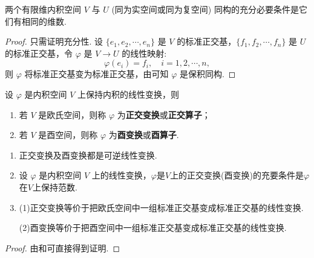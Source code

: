 \documentclass[../../main.tex]{subfiles}%
\begin{document}
\begin{corollary}\label{corollary:有限维内积空间同构的充要条件}
两个有限维内积空间 $V$ 与 $U$ (同为实空间或同为复空间) 同构的充分必要条件是它们有相同的维数.
\end{corollary}
\begin{proof}
只需证明充分性. 设 $\{e_1,e_2,\cdots,e_n\}$ 是 $V$ 的标准正交基，$\{f_1,f_2,\cdots,f_n\}$ 是 $U$ 的标准正交基，令 $\varphi$ 是 $V \to U$ 的线性映射:
\[
\varphi(e_i) = f_i,\quad i = 1,2,\cdots,n,
\]
则 $\varphi$ 将标准正交基变为标准正交基，由可知 $\varphi$ 是保积同构.
\end{proof}

\begin{definition}
设 $\varphi$ 是内积空间 $V$ 上保持内积的线性变换，则
\begin{enumerate}
\item 若 $V$ 是欧氏空间，则称 $\varphi$ 为\textbf{正交变换}或\textbf{正交算子}；

\item 若 $V$ 是酉空间，则称 $\varphi$ 为\textbf{酉变换}或\textbf{酉算子}.
\end{enumerate}
\end{definition}

\begin{theorem}\label{theorem:正交变换和酉变换的基本性质}
\begin{enumerate}
\item 正交变换及酉变换都是可逆线性变换.

\item 设 $\varphi$ 是内积空间 $V$ 上的线性变换，$\varphi$是$V$上的正交变换(酉变换)的充要条件是$\varphi$在$V$上保持范数.

\item (1)正交变换等价于把欧氏空间中一组标准正交基变成标准正交基的线性变换.

(2)酉变换等价于把酉空间中一组标准正交基变成标准正交基的线性变换.
\end{enumerate}
\end{theorem}
\begin{proof}
由和可直接得到证明.
\end{proof}
\end{document}
